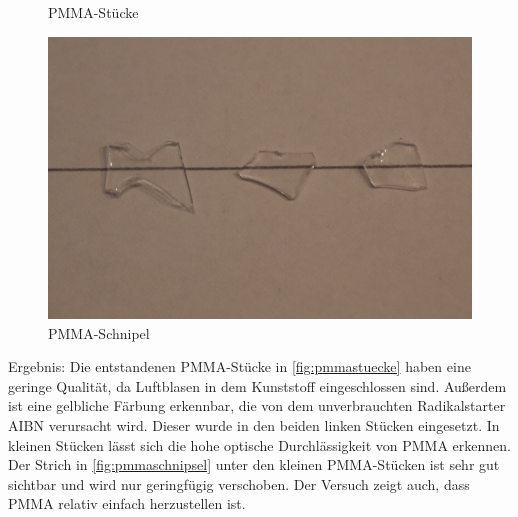 \begin{figure}[h]
\begin{center}
\begin{minipage}[t]{0.3\textwidth}
\begin{center}
                \caption[PMMA-Stücke]{PMMA-Stücke}
                \label{fig:pmmastuecke}
            \end{center}
        \end{minipage}
        \hspace{0.025\textwidth}
        \begin{minipage}[t]{0.3\textwidth}
            \begin{center}
                \includegraphics[height=0.1\textheight]{Bilder/Optische_Wellenleiter_Die_Polymer_Optische_Faser/Kernmaterialien/pmmaschnipsel.png}
                \caption[PMMA-Schnipsel]{PMMA-Schnipel}
                \label{fig:pmmaschnipsel}
            \end{center}
        \end{minipage}
    \end{center}
\end{figure}

Ergebnis: Die entstandenen PMMA-Stücke in \autoref{fig:pmmastuecke} haben eine
geringe Qualität, da Luftblasen in dem Kunststoff eingeschlossen sind. Außerdem
ist eine gelbliche Färbung erkennbar, die von dem unverbrauchten Radikalstarter
AIBN verursacht wird. Dieser wurde in den beiden linken Stücken eingesetzt. In
kleinen Stücken lässt sich die hohe optische Durchlässigkeit von PMMA erkennen.
Der Strich in \autoref{fig:pmmaschnipsel} unter den kleinen PMMA-Stücken ist
sehr gut sichtbar und wird nur geringfügig verschoben. Der Versuch zeigt auch,
dass PMMA relativ einfach herzustellen ist.
